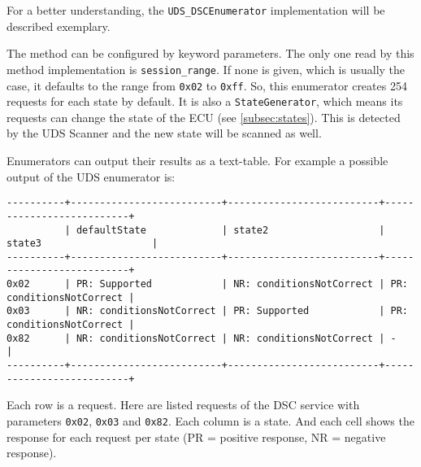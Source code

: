 For a better understanding, the \texttt{UDS_DSCEnumerator} implementation will be described exemplary.


The method can be configured by keyword parameters. The only one read by this method implementation is \texttt{session_range}. If none is given, which is usually the case, it defaults to the range from \texttt{0x02} to \texttt{0xff}. So, this enumerator creates 254 requests for each state by default. It is also a \texttt{StateGenerator}, which means its requests can change the state of the ECU (see \autoref{subsec:states}). This is detected by the UDS Scanner and the new state will be scanned as well.

Enumerators can output their results as a text-table. For example a possible output of the UDS enumerator is:

\begin{samepage}
\begin{verbatim}
----------+--------------------------+--------------------------+--------------------------+
          | defaultState             | state2                   | state3                   | 
----------+--------------------------+--------------------------+--------------------------+
0x02      | PR: Supported            | NR: conditionsNotCorrect | PR: conditionsNotCorrect | 
0x03      | NR: conditionsNotCorrect | PR: Supported            | PR: conditionsNotCorrect | 
0x82      | NR: conditionsNotCorrect | NR: conditionsNotCorrect | -                        | 
----------+--------------------------+--------------------------+--------------------------+
\end{verbatim}
\end{samepage}

Each row is a request. Here are listed requests of the DSC service with parameters \texttt{0x02}, \texttt{0x03} and \texttt{0x82}. Each column is a state. And each cell shows the response for each request per state (PR = positive response, NR = negative response).

